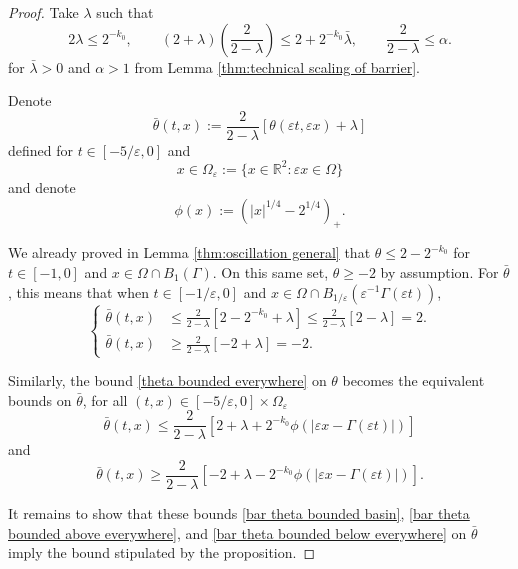 \documentclass[11pt]{amsart}
\theoremstyle{remark}
\theoremstyle{definition}
\newcommand{\R}{\mathbb{R}}
\newcommand{\eps}{\varepsilon}
\newcommand{\paren}[1]{\left( #1 \right)}
\newcommand{\bracket}[1]{\left[ #1 \right]}
\newcommand{\n}{^{-1}}
\begin{document}
\begin{proof}
Take $\lambda$ such that
\begin{equation} \label{lambda smallness assumptions} 2\lambda \leq 2^{-k_0}, \qquad (2+\lambda)(\frac{2}{2-\lambda}) \leq 2 + 2^{-k_0} \bar{\lambda}, \qquad \frac{2}{2-\lambda} \leq \alpha. \end{equation}
for $\bar{\lambda}>0$ and $\alpha>1$ from Lemma \ref{thm:technical scaling of barrier}.  

Denote 
\[ \bar{\theta}(t,x) := \frac{2}{2-\lambda} \bracket{\theta(\eps t, \eps x) + \lambda} \]
defined for $t \in [-5/\eps,0]$ and 
\[ x \in \Omega_\eps := \{x\in \R^2: \eps x \in \Omega\} \]
and denote
\[ \phi(x) := \paren{|x|^{1/4} - 2^{1/4}}_+. \]

We already proved in Lemma \ref{thm:oscillation general} that $\theta \leq 2 - 2^{-k_0}$ for $t \in [-1,0]$ and $x \in \Omega\cap B_1(\Gamma)$.  On this same set, $\theta \geq -2$ by assumption.  For $\bar{\theta}$, this means that when $t \in [-1/\eps, 0]$ and $x \in \Omega \cap B_{1/\eps}(\eps\n \Gamma(\eps t))$,
\begin{equation}\label{bar theta bounded basin} \begin{cases}
\bar{\theta}(t,x) &\leq \frac{2}{2-\lambda} \bracket{2-2^{-k_0}+\lambda} \leq \frac{2}{2-\lambda} \bracket{2-\lambda} = 2. \\
\bar{\theta}(t,x) &\geq \frac{2}{2-\lambda} \bracket{-2+\lambda} = -2.
\end{cases} \end{equation}

Similarly, the bound \eqref{theta bounded everywhere} on $\theta$ becomes the equivalent bounds on $\bar{\theta}$, for all $(t,x) \in [-5/\eps,0] \times \Omega_\eps$
\begin{equation} \bar{\theta}(t,x) \leq \frac{2}{2-\lambda} \bracket{2 + \lambda + 2^{-k_0} \phi(|\eps x - \Gamma(\eps t)|)} \label{bar theta bounded above everywhere} \end{equation}
and
\begin{equation} \bar{\theta}(t,x) \geq \frac{2}{2-\lambda} \bracket{- 2 + \lambda - 2^{-k_0} \phi(|\eps x - \Gamma(\eps t)|)}. \label{bar theta bounded below everywhere} \end{equation}

It remains to show that these bounds \eqref{bar theta bounded basin}, \eqref{bar theta bounded above everywhere}, and \eqref{bar theta bounded below everywhere} on $\bar{\theta}$ imply the bound stipulated by the proposition.  


\end{proof}
\end{document}

